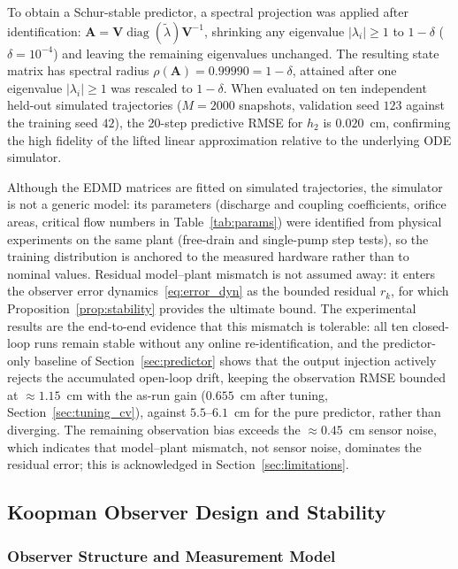 \documentclass[asi,article,accept,pdftex,moreauthors]{Definitions/mdpi}
\newcommand{\rev}[1]{#1}%
\begin{document}
{To obtain a Schur-stable predictor, a spectral projection was applied after identification: $\mathbf A=\mathbf V\operatorname{diag}(\tilde\lambda)\mathbf V^{-1}$, shrinking any eigenvalue $|\lambda_i| \ge 1$ to $1-\delta$ ($\delta=10^{-4}$) and leaving the remaining eigenvalues unchanged. The resulting state matrix has spectral radius $\rho(\mathbf{A}) = 0.99990 = 1-\delta$, attained after one eigenvalue $|\lambda_i| \ge 1$ was rescaled to $1-\delta$. When evaluated on ten independent held-out simulated trajectories ($M=2000$ snapshots, validation seed $123$ against the training seed $42$), the 20-step predictive RMSE for $h_2$ is $0.020$~cm, confirming the high fidelity of the lifted linear approximation relative to the underlying ODE simulator.}

\rev{Although the EDMD matrices are fitted on simulated trajectories, the simulator is not a generic model: its parameters (discharge and coupling coefficients, orifice areas, critical flow numbers in Table~\ref{tab:params}) were identified from physical experiments on the same plant (free-drain and single-pump step tests), so the training distribution is anchored to the measured hardware rather than to nominal values. Residual model--plant mismatch is not assumed away: it enters the observer error dynamics~\eqref{eq:error_dyn} as the bounded residual $r_k$, for which Proposition~\ref{prop:stability} provides the ultimate bound. The experimental results are the end-to-end evidence that this mismatch is tolerable: all ten closed-loop runs remain stable without any online re-identification, and the predictor-only baseline of Section~\ref{sec:predictor} shows that the output injection actively rejects the accumulated open-loop drift, keeping the observation RMSE bounded at $\approx 1.15$~cm with the as-run gain ($0.655$~cm after tuning, Section~\ref{sec:tuning_cv}), against $5.5$--$6.1$~cm for the pure predictor, rather than diverging. The remaining observation bias exceeds the $\approx 0.45$~cm sensor noise, which indicates that model--plant mismatch, not sensor noise, dominates the residual error; this is acknowledged in Section~\ref{sec:limitations}.}

\subsection{Koopman Observer Design and Stability}
\label{sec:koopman_obs}

\subsubsection{Observer Structure and Measurement Model}
\end{document}
